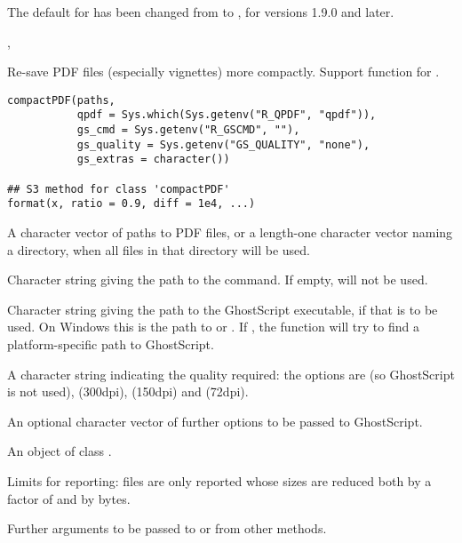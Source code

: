 %
\begin{Note}\relax
The default for  has been changed from
 to , for \R{} versions 1.9.0 and later.
\end{Note}
%
\begin{SeeAlso}\relax
{}, 
\end{SeeAlso}
%
\begin{Description}\relax
Re-save PDF files (especially vignettes) more compactly.
Support function for .
\end{Description}
%
\begin{Usage}
\begin{verbatim}
compactPDF(paths,
           qpdf = Sys.which(Sys.getenv("R_QPDF", "qpdf")),
           gs_cmd = Sys.getenv("R_GSCMD", ""),
           gs_quality = Sys.getenv("GS_QUALITY", "none"),
           gs_extras = character())

## S3 method for class 'compactPDF'
format(x, ratio = 0.9, diff = 1e4, ...)
\end{verbatim}
\end{Usage}
%
\begin{Arguments}
\begin{ldescription}
\item[\code{paths}] A character vector of paths to PDF files, or a length-one
character vector naming a directory, when all  files in
that directory will be used.
\item[\code{qpdf}] Character string giving the path to the 
command.  If empty,  will not be used.
\item[\code{gs\_cmd}] Character string giving the path to the GhostScript
executable, if that is to be used.  On Windows this is the path to
 or .  If , the
function will try to find a platform-specific path to GhostScript.
\item[\code{gs\_quality}] A character string indicating the quality required:
the options are  (so GhostScript is not used),
 (300dpi),  (150dpi) and
 (72dpi).
\item[\code{gs\_extras}] An optional character vector of further options to be
passed to GhostScript.
\item[\code{x}] An object of class .
\item[\code{ratio, diff}] Limits for reporting: files are only reported whose
sizes are reduced both by a factor of  and by
 bytes.
\item[\code{...}] Further arguments to be passed to or from other methods.
\end{ldescription}
\end{Arguments}
